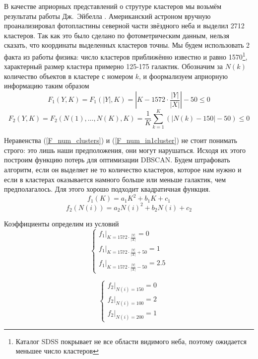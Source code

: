 \documentclass[12pt,fleqn]{article}
\begin{document}
В качестве априорных представлений о струтуре кластеров мы возьмём результаты работы Дж.~Эйбелла \cite{Abell}. Американский астроном вручную проанализировал фотопластины северной части звёздного неба и выделил 2712 кластеров. Так как это было сделано по фотометрическим данным, нельзя сказать, что координаты выделенных кластеров точны. Мы будем использовать 2 факта из работы физика: число кластеров приближённо известно и равно 1570\footnote{Каталог SDSS покрывает не все области видимого неба, поэтому ожидается меньшее число кластеров}, характерный размер кластера примерно 125-175 галактик.
Обозначим за $N(k)$ количество объектов в кластере с номером $k$, и фоормализуем априорную информацию таким образом
\begin{equation}\label{F_num_clusters}
  F_1(Y, K) = F_1(|Y|, K) = |K -  1572\cdot \frac{|Y|}{|X|}| - 50  \leq 0
\end{equation}
\begin{equation}\label{F_num_in1cluster}
  F_2(Y, K) =  F_2(N(1), \dots, N(K), K) = \frac{1}{K} \sum_{k=1}^K \left( | N(k) -150 | - 50 \right)  \leq 0
\end{equation}

Неравенства (\ref{F_num_clusters}) и (\ref{F_num_in1cluster}) не стоит понимать строго: это лишь наши предположения, они могут нарушаться. Исходя их этого построим функцию потерь для оптимизации DBSCAN. Будем штрафовать алгоритм, если он выделяет не то количество кластеров, которое нам нужно и если в кластерах оказывается намного больше или меньше галактик, чем предполагалось. Для этого хорошо подходит квадратичная функция. 
$$f_1(K) = a_1K^2 + b_1K + c_1$$
$$f_2(N(i)) = a_2N(i)^2 + b_2N(i) + c_2$$

Коэффициенты определим из условий
\begin{equation}\label{system_num_cl}
 \begin{cases}
   f_1|_{K=1572 \cdot \frac{|Y|}{|X|}} = 0
   \\
   f_1|_{K=1572 \cdot \frac{|Y|}{|X|} + 50} = 1
   \\
   f_1|_{K=1572 \cdot \frac{|Y|}{|X|} - 50} = 2.5
 \end{cases}
\end{equation}

\begin{equation}\label{system_num_in1cl}
 \begin{cases}
   f_2|_{N(i)=150} = 0
   \\
   f_2|_{N(i)=100} = 2
   \\
   f_2|_{N(i)=200} = 1
 \end{cases}
\end{equation}
\end{document}
